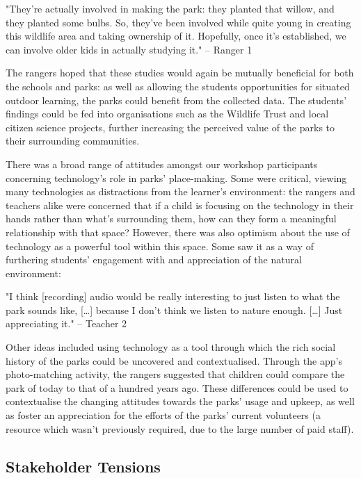 \begin{displayquote}
"They're actually involved in making the park: they planted that willow, and they planted some bulbs. So, they've been involved while quite young in creating this wildlife area and taking ownership of it. Hopefully, once it's established, we can involve older kids in actually studying it." – Ranger 1
\end{displayquote}

The rangers hoped that these studies would again be mutually beneficial for both the schools and parks: as well as allowing the students opportunities for situated outdoor learning, the parks could benefit from the collected data. The students’ findings could be fed into organisations such as the Wildlife Trust and local citizen science projects, further increasing the perceived value of the parks to their surrounding communities.

There was a broad range of attitudes amongst our workshop participants concerning technology’s role in parks’ place-making. Some were critical, viewing many technologies as distractions from the learner’s environment: the rangers and teachers alike were concerned that if a child is focusing on the technology in their hands rather than what’s surrounding them, how can they form a meaningful relationship with that space? However, there was also optimism about the use of technology as a powerful tool within this space. Some saw it as a way of furthering students’ engagement with and appreciation of the natural environment:

\begin{displayquote}
"I think [recording] audio would be really interesting to just listen to what the park sounds like, […] because I don't think we listen to nature enough. […] Just appreciating it." – Teacher 2
\end{displayquote}

Other ideas included using technology as a tool through which the rich social history of the parks could be uncovered and contextualised. Through the app’s photo-matching activity, the rangers suggested that children could compare the park of today to that of a hundred years ago. These differences could be used to contextualise the changing attitudes towards the parks’ usage and upkeep, as well as foster an appreciation for the efforts of the parks’ current volunteers (a resource which wasn't previously required, due to the large number of paid staff).

\subsection{Stakeholder Tensions}

